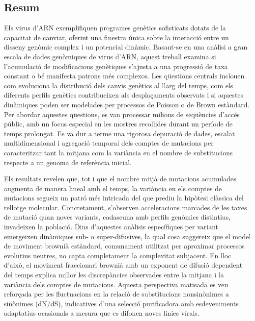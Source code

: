 \vspace{-1cm}

\subsection*{\myself}

\subsection*{Resum}
Els virus d'ARN exemplifiquen programes genètics sofisticats dotats de la capacitat de canviar, oferint una finestra única sobre la interacció entre un disseny genòmic complex i un potencial dinàmic. Basant-se en una anàlisi a gran escala de dades genòmiques de virus d'ARN, aquest treball examina si l'acumulació de modificacions genètiques s'ajusta a una progressió de taxa constant o bé manifesta patrons més complexos. Les qüestions centrals inclouen com evoluciona la distribució dels canvis genètics al llarg del temps, com els diferents perfils genètics contribueixen als desplaçaments observats i si aquestes dinàmiques poden ser modelades per processos de Poisson o de Brown estàndard. Per abordar aquestes qüestions, es van processar milions de seqüències d'accés públic, amb un focus especial en les mostres recollides durant un període de temps prolongat. Es va dur a terme una rigorosa depuració de dades, escalat multidimensional i agregació temporal dels comptes de mutacions per caracteritzar tant la mitjana com la variància en el nombre de substitucions respecte a un genoma de referència inicial.

Els resultats revelen que, tot i que el nombre mitjà de mutacions acumulades augmenta de manera lineal amb el temps, la variància en els comptes de mutacions segueix un patró més intricada del que prediu la hipòtesi clàssica del rellotge molecular. Concretament, s'observen acceleracions marcades de les taxes de mutació quan noves variants, cadascuna amb perfils genòmics distintius, invadeixen la població. Dins d'aquestes anàlisis específiques per variant emergeixen dinàmiques sub- o super-difusives, la qual cosa suggereix que el model de moviment brownià estàndard, comunament utilitzat per aproximar processos evolutius neutres, no capta completament la complexitat subjacent. En lloc d'això, el moviment fraccionari brownià amb un exponent de difusió dependent del temps explica millor les discrepàncies observades entre la mitjana i la variància dels comptes de mutacions. Aquesta perspectiva matisada es veu reforçada per les fluctuacions en la relació de substitucions nonsinònimes a sinònimes (dN/dS), indicatives d'una selecció purificadora amb esdeveniments adaptatius ocasionals a mesura que es difonen noves línies vírals.

